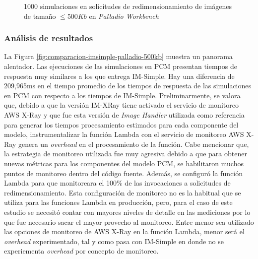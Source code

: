 \begin{figure}[h]
\hspace{-2cm}
\caption{1000 simulaciones en solicitudes de redimensionamiento de imágenes de tamaño $\leq 500Kb$ en \emph{Palladio Workbench}}
\label{fig:funcion-acumulada-palladio-500kb}
\end{figure}

\subsubsection{Análisis de resultados} 
La Figura \ref{fig:comparacion-imsimple-palladio-500kb} muestra un panorama alentador. Las ejecuciones de las simulaciones en PCM presentan tiempos de respuesta muy similares a los que entrega IM-Simple. Hay una diferencia de 209,965ms en el tiempo promedio de los tiempos de respuesta de las simulaciones en PCM con respecto a los tiempos de IM-Simple. Preliminarmente, se valora que, debido a que la versión IM-XRay tiene activado el servicio de monitoreo AWS X-Ray y que fue esta versión de \emph{Image Handler} utilizada como referencia para generar los tiempos procesamiento estimados para cada componente del modelo, instrumentalizar la función Lambda con el servicio de monitoreo AWS X-Ray genera un \emph{overhead} en el procesamiento de la función. Cabe mencionar que, la estrategia de monitoreo utilizada fue muy agresiva debido a que para obtener nuevas métricas para los componentes del modelo PCM, se habilitaron muchos puntos de monitoreo dentro del código fuente. Además, se configuró la función Lambda para que monitoreara el 100\% de las invocaciones a solicitudes de redimensionamiento. Esta configuración de monitoreo no es la habitual que se utiliza para las funciones Lambda en producción, pero, para el caso de este estudio se necesitó contar con mayores niveles de detalle en las mediciones por lo que fue necesario sacar el mayor provecho al monitoreo. Entre menor sea utilizado las opciones de monitoreo de AWS X-Ray en la función Lambda, menor será el \emph{overhead} experimentado, tal y como pasa con IM-Simple en donde no se experiementa \emph{overhead} por concepto de monitoreo.

